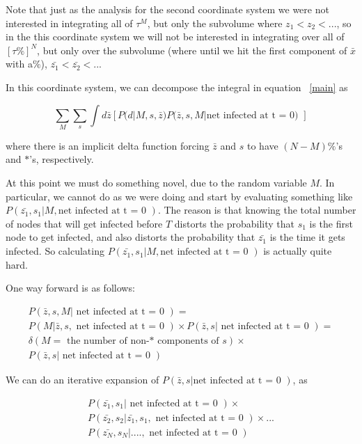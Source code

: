 \documentclass{article}
\begin{document}
    Note that just as the analysis for the second coordinate system we were not interested in integrating
    all of $\tau^M$, but only the subvolume where $z_1 < z_2 < ...$, so in the this coordinate system
    we will not be interested in integrating over all of $[\tau\%]^N$, but only over the subvolume
    (where until we hit the first component of $\bar{x}$ with a$\%$), $\bar{z_1} < \bar{z_2} < ...$

    In this coordinate system, we can decompose the integral in equation ~\ref{main} as

\begin{equation}
\sum_{M}  \sum_{s}  \int d\bar{z}  [P(d | M, s, \bar{z})  P(\bar{z}, s, M | \text{net infected at t = 0) }]
\end{equation}

where there is an implicit delta function forcing $\bar{z}$ and $s$ to have $(N - M) \%$'s and $*$'s, respectively.

At this point we must do something novel, due to the random variable $M$. In particular,
we cannot do as we were doing and start by evaluating something like
$P(\bar{z_1}, s_1 | M, \text{net infected at t = 0 })$. The reason is that knowing the total number
of nodes that will get infected before $T$ distorts the probability that $s_1$ is the first
node to get infected, and also distorts the probability that $\bar{z_1}$ is the time it gets infected.
So calculating $P(\bar{z_1}, s_1 | M, \text{net infected at t = 0 })$ is actually quite hard.

One way forward is as follows:

\begin{align}
P(\bar{z}, s, M | \text{ net infected at t = 0 }) = \\ \nonumber
P(M | \bar{z}, s, \text{ net infected at t = 0 })  \times  P(\bar{z}, s | \text{ net infected at t = 0 }) = \\  \nonumber
\delta(M = \text{ the number of non-* components of } s)  \times \\
P(\bar{z}, s | \text{ net infected at t = 0 })
\end{align}


We can do an iterative expansion of $P(\bar{z}, s | \text{net infected at t = 0 })$,
 as

\begin{align}
P(\bar{z_1}, s_1 | \text{ net infected at t = 0 }) \times \\ \nonumber
P(\bar{z_2}, s_2 | \bar{z_1}, s_1, \text{ net infected at t = 0 }) \times ... \\ \nonumber
P(\bar{z_N}, s_N  | ...., \text{ net infected at t = 0 })
\end{align}
\end{document}
